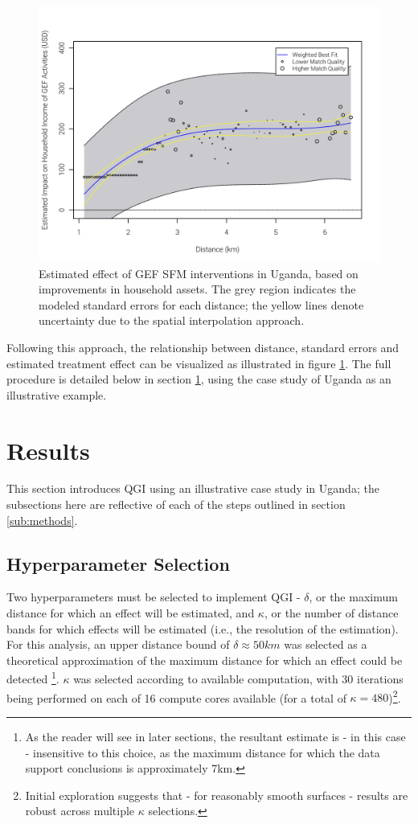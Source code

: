 \documentclass[sustainability,article,submit,moreauthors,pdftex]{Definitions/mdpi}
\begin{document}
\begin{figure}[!ht]
\includegraphics[width=\textwidth]{Figures/GEF_distanceDecay.png}
\caption{Estimated effect of GEF SFM interventions in Uganda, based on improvements in household assets.  The grey region indicates the modeled standard errors for each distance; the yellow lines denote uncertainty due to the spatial interpolation approach.}
\label{fig:GEF}
\end{figure}

Following this approach, the relationship between distance, standard errors and estimated treatment effect can be visualized as illustrated in figure \ref{fig:GEF}. The full procedure is detailed below in section \ref{results}, using the case study of Uganda as an illustrative example.  


\section{Results}\label{results}
This section introduces QGI using an illustrative case study in Uganda; the subsections here are reflective of each of the steps outlined in section \ref{sub:methods}. 
\subsection{Hyperparameter Selection}
Two hyperparameters must be selected to implement QGI - $\delta$, or the maximum distance for which an effect will be estimated, and $\kappa$, or the number of distance bands for which effects will be estimated (i.e., the resolution of the estimation).  For this analysis, an upper distance bound of $\delta \approx 50km$ was selected as a theoretical approximation of the maximum distance for which an effect could be detected \footnote{As the reader will see in later sections, the resultant estimate is - in this case - insensitive to this choice, as the maximum distance for which the data support conclusions is approximately 7km.}.  $\kappa$ was selected according to available computation, with 30 iterations being performed on each of 16 compute cores available (for a total of $\kappa = 480$)\footnote{Initial exploration suggests that - for reasonably smooth surfaces - results are robust across multiple $\kappa$ selections.}.  
\end{document}
